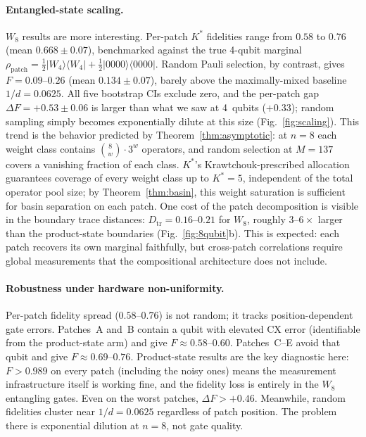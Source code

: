 \documentclass[twocolumn,prx,aps,superscriptaddress,longbibliography,floatfix]{revtex4-2}
\begin{document}
\paragraph{Entangled-state scaling.}
$W_8$ results are more interesting.
Per-patch $K^*$ fidelities range from $0.58$ to $0.76$
(mean $0.668 \pm 0.07$), benchmarked against the true 4-qubit
marginal $\rho_\mathrm{patch} = \tfrac{1}{2}|W_4\rangle\langle
W_4| + \tfrac{1}{2}|0000\rangle\langle 0000|$.
Random Pauli selection, by contrast, gives $F = 0.09$--$0.26$
(mean $0.134 \pm 0.07$), barely above the maximally-mixed baseline
$1/d = 0.0625$.
All five bootstrap CIs exclude zero, and the per-patch gap
$\Delta F = +0.53 \pm 0.06$ is larger than what we saw at 4~qubits
($+0.33$); random sampling simply becomes exponentially dilute
at this size (Fig.~\ref{fig:scaling}).
This trend is the behavior predicted by
Theorem~\ref{thm:asymptotic}: at $n = 8$ each weight class
contains $\binom{8}{w} \cdot 3^w$ operators, and random selection
at $M = 137$ covers a vanishing fraction of each class.
$K^*$'s Krawtchouk-prescribed allocation guarantees coverage of
every weight class up to $K^* = 5$, independent of the total
operator pool size; by Theorem~\ref{thm:basin}, this weight
saturation is sufficient for basin separation on each patch.
One cost of the patch decomposition is visible in the boundary
trace distances: $D_\mathrm{tr} = 0.16$--$0.21$ for $W_8$,
roughly $3$--$6\times$ larger than the product-state boundaries
(Fig.~\ref{fig:8qubit}b).
This is expected: each patch recovers its own marginal
faithfully, but cross-patch correlations require global measurements
that the compositional architecture does not include.

\paragraph{Robustness under hardware non-uniformity.}
Per-patch fidelity spread ($0.58$--$0.76$) is not random;
it tracks position-dependent gate errors.
Patches~A and~B contain a qubit with elevated CX error
(identifiable from the product-state arm) and give
$F \approx 0.58$--$0.60$.
Patches~C--E avoid that qubit and give $F \approx 0.69$--$0.76$.
Product-state results are the key diagnostic here:
$F > 0.989$ on every patch (including the noisy ones) means the
measurement infrastructure itself is working fine, and the fidelity
loss is entirely in the $W_8$ entangling gates.
Even on the worst patches, $\Delta F > +0.46$.
Meanwhile, random fidelities cluster near $1/d = 0.0625$ regardless
of patch position. The problem there is exponential dilution at
$n = 8$, not gate quality.
\end{document}
